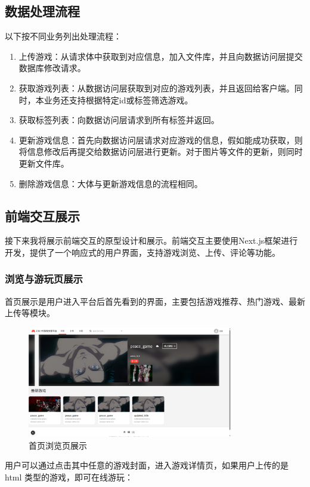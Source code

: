 \documentclass[12pt]{ctexart} %
\begin{document}
\subsection{数据处理流程}
以下按不同业务列出处理流程：
\begin{enumerate}
  \item 上传游戏：从请求体中获取到对应信息，加入文件库，并且向数据访问层提交数据库修改请求。
  \item 获取游戏列表：从数据访问层获取到对应的游戏列表，并且返回给客户端。同时，本业务还支持根据特定id或标签筛选游戏。
  \item 获取标签列表：向数据访问层请求到所有标签并返回。
  \item 更新游戏信息：首先向数据访问层请求对应游戏的信息，假如能成功获取，则将信息修改后再提交给数据访问层进行更新。对于图片等文件的更新，则同时更新文件库。
  \item 删除游戏信息：大体与更新游戏信息的流程相同。
\end{enumerate}
\subsection{前端交互展示}
接下来我将展示前端交互的原型设计和展示。前端交互主要使用Next.js框架进行开发，提供了一个响应式的用户界面，支持游戏浏览、上传、评论等功能。

\subsubsection{浏览与游玩页展示}

首页展示是用户进入平台后首先看到的界面，主要包括游戏推荐、热门游戏、最新上传等模块。

\begin{figure}[H]
  \centering 
  \includegraphics[width=0.8\textwidth]{mainwebpage.png}
  \caption{首页浏览页展示}
\end{figure}

用户可以通过点击其中任意的游戏封面，进入游戏详情页，如果用户上传的是 html 类型的游戏，即可在线游玩：
\end{document}
